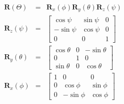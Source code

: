 \begin{equation}
    \begin{aligned}
        \mathbf{R}(\Theta)   & = & \mathbf{R}_x(\phi)  \mathbf{R}_y(\theta) \mathbf{R}_z(\psi) \\
        \mathbf{R}_z(\psi)   & = &
        \begin{bmatrix}
            \cos\psi  & \sin\psi & 0 \\
            -\sin\psi & \cos\psi & 0 \\
            0         & 0        & 1
        \end{bmatrix}                                                               \\
        \mathbf{R}_y(\theta) & = &
        \begin{bmatrix}
            \cos\theta & 0 & -\sin\theta \\
            0          & 1 & 0           \\
            \sin\theta & 0 & \cos\theta
        \end{bmatrix}                                                           \\
        \mathbf{R}_x(\phi)   & = &
        \begin{bmatrix}
            1 & 0         & 0        \\
            0 & \cos\phi  & \sin\phi \\
            0 & -\sin\phi & \cos\phi
        \end{bmatrix}
    \end{aligned}
\end{equation}

